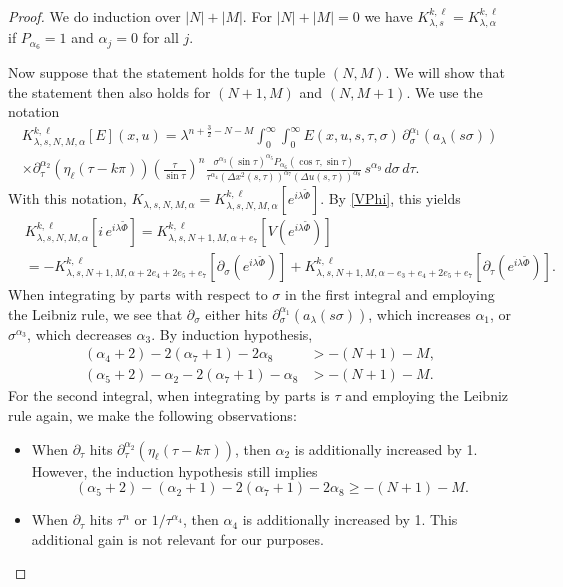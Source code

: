 \documentclass[10pt,a4paper]{amsart}
\begin{document}
\begin{proof}
We do induction over $|N| + |M|$. For $|N| + |M| = 0$ we have $K_{\lambda,s}^{k,\ell} = K_{\lambda,\alpha}^{k,\ell}$ if $P_{\alpha_6} = 1$ and $\alpha_j = 0$ for all $j$.

 Now suppose that the statement holds for the tuple $(N,M)$. We will show that the statement then also holds for $(N + 1,M)$ and $(N,M + 1)$. We use the notation
\begin{multline*}
K_{\lambda,s,N,M,\alpha}^{k,\ell}[E](x, u)
 = \lambda^{n + \frac{3}{2}-N-M} \int_0^\infty \int_0^\infty E(x,u,s,\tau,\sigma) \, \partial_\sigma^{\alpha_1} (a_{\lambda}(s \sigma)) \\
 \times \partial_\tau^{\alpha_2}(\eta_\ell(\tau-k \pi))
 \left(\frac{\tau}{\sin \tau}\right)^{n} \frac{\sigma^{\alpha_3} \left(\sin \tau\right)^{\alpha_5} P_{\alpha_6}(\cos\tau,\sin\tau)}{ \tau^{\alpha_ 4 } \left( \Delta x^2 (s,\tau) \right)^{\alpha_7}\left( \Delta u(s,\tau) \right)^{\alpha_8} } \, s^{\alpha_9} \, d\sigma \, d \tau.
\end{multline*}
With this notation, $K_{\lambda,s,N,M,\alpha} = K_{\lambda,s,N,M,\alpha}^{k,\ell}[e^{i\lambda \tilde \Phi}]$.
 By \eqref{VPhi}, this yields
\begin{align*}
& K_{\lambda,s,N,M,\alpha}^{k,\ell}[i\,e^{i\lambda \tilde \Phi}]
 = K_{\lambda,s,N + 1,M,\alpha + e_7}^{k,\ell}[V(e^{i\lambda \tilde \Phi})] \\ 
& = -K_{\lambda,s,N + 1,M,\alpha + 2e_ 4 + 2e_5 + e_7}^{k,\ell}[\partial_\sigma(e^{i\lambda \tilde \Phi})] + K_{\lambda,s,N + 1,M,\alpha-e_3 + e_ 4 + 2e_5 + e_7}^{k,\ell}[\partial_\tau(e^{i\lambda \tilde \Phi})].
\end{align*}
When integrating by parts  with respect to $\sigma$ in the first integral and employing the Leibniz  rule, we see that $\partial_\sigma$ either hits $\partial_\sigma^{\alpha_1} (a_{\lambda}(s \sigma))$, which increases $\alpha_1$, or $\sigma^{\alpha_3}$, which decreases $\alpha_3$. By induction hypothesis,
\begin{align*}
(\alpha_ 4 + 2)-2(\alpha_7 + 1)-2\alpha_8 & > -(N + 1)-M, \\
(\alpha_5 + 2)-\alpha_2-2(\alpha_7 + 1)-\alpha_8 & > -(N + 1)-M.
\end{align*}
For the second integral, when  integrating  by parts is $\tau$ and  employing the Leibniz   rule again, we make the following observations:
\begin{itemize}
\item[(i)] When $\partial_\tau$ hits $\partial_\tau^{\alpha_2}(\eta_\ell(\tau-k \pi))$, then $\alpha_2$ is additionally increased by 1. However, the induction hypothesis still implies
\[
(\alpha_5 + 2)-(\alpha_2 + 1)-2(\alpha_7 + 1)-2\alpha_8 \ge -(N + 1)-M.
\]
\item[(ii)] When $\partial_\tau$ hits $\tau^{n}$ or $1/\tau^{\alpha_ 4 }$, then $\alpha_ 4 $ is additionally increased by 1. This additional gain is not relevant for our purposes.


\end{itemize}
\end{proof}
\end{document}
